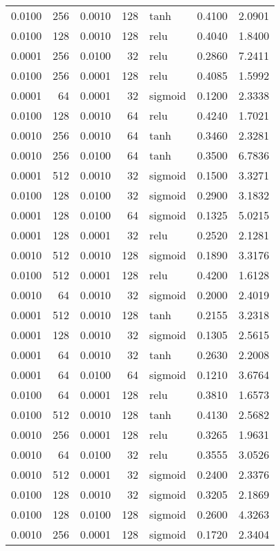 \begin{table}
\begin{tabular}{rrrrlrr}
0.0100 & 256 & 0.0010 & 128 & tanh & 0.4100 & 2.0901 \\
0.0100 & 128 & 0.0010 & 128 & relu & 0.4040 & 1.8400 \\
0.0001 & 256 & 0.0100 & 32 & relu & 0.2860 & 7.2411 \\
0.0100 & 256 & 0.0001 & 128 & relu & 0.4085 & 1.5992 \\
0.0001 & 64 & 0.0001 & 32 & sigmoid & 0.1200 & 2.3338 \\
0.0100 & 128 & 0.0010 & 64 & relu & 0.4240 & 1.7021 \\
0.0010 & 256 & 0.0010 & 64 & tanh & 0.3460 & 2.3281 \\
0.0010 & 256 & 0.0100 & 64 & tanh & 0.3500 & 6.7836 \\
0.0001 & 512 & 0.0010 & 32 & sigmoid & 0.1500 & 3.3271 \\
0.0100 & 128 & 0.0100 & 32 & sigmoid & 0.2900 & 3.1832 \\
0.0001 & 128 & 0.0100 & 64 & sigmoid & 0.1325 & 5.0215 \\
0.0001 & 128 & 0.0001 & 32 & relu & 0.2520 & 2.1281 \\
0.0010 & 512 & 0.0010 & 128 & sigmoid & 0.1890 & 3.3176 \\
0.0100 & 512 & 0.0001 & 128 & relu & 0.4200 & 1.6128 \\
0.0010 & 64 & 0.0010 & 32 & sigmoid & 0.2000 & 2.4019 \\
0.0001 & 512 & 0.0010 & 128 & tanh & 0.2155 & 3.2318 \\
0.0001 & 128 & 0.0010 & 32 & sigmoid & 0.1305 & 2.5615 \\
0.0001 & 64 & 0.0010 & 32 & tanh & 0.2630 & 2.2008 \\
0.0001 & 64 & 0.0100 & 64 & sigmoid & 0.1210 & 3.6764 \\
0.0100 & 64 & 0.0001 & 128 & relu & 0.3810 & 1.6573 \\
0.0100 & 512 & 0.0010 & 128 & tanh & 0.4130 & 2.5682 \\
0.0010 & 256 & 0.0001 & 128 & relu & 0.3265 & 1.9631 \\
0.0010 & 64 & 0.0100 & 32 & relu & 0.3555 & 3.0526 \\
0.0010 & 512 & 0.0001 & 32 & sigmoid & 0.2400 & 2.3376 \\
0.0100 & 128 & 0.0010 & 32 & sigmoid & 0.3205 & 2.1869 \\
0.0100 & 128 & 0.0100 & 128 & sigmoid & 0.2600 & 4.3263 \\
0.0010 & 256 & 0.0001 & 128 & sigmoid & 0.1720 & 2.3404 \\

\end{tabular}
\end{table}
